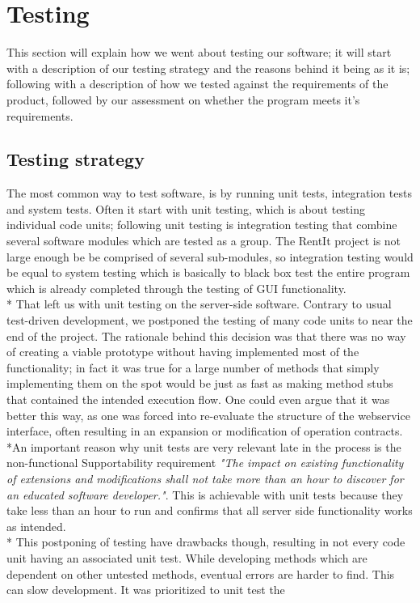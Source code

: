 \documentclass[a4paper,11pt,report]{article}
\begin{document}
{\section{Testing}
This section will explain how we went about testing our software; it will start with a description of our testing strategy and the reasons behind it being
as it is; following with a description of how we tested against the requirements of the product, followed by our assessment on whether the program meets it's requirements.

\subsection{Testing strategy}
The most common way to test software, is by running unit tests, integration tests and system tests. Often it start with unit testing, which is about testing individual code units; following unit testing is integration testing that combine several software modules which are tested as a group. The RentIt project is not large enough be be comprised of
several sub-modules, so integration testing would be equal to system testing which is basically to black box test the entire program which is already completed
through the testing of GUI functionality.
\\*
That left us with unit testing on the server-side software. Contrary to usual test-driven development, we postponed the testing of many code units to near
the end of the project. The rationale behind this decision was that there was no way of creating a viable prototype without having implemented most of the 
functionality; in fact it was true for a large number of methods that simply implementing them on the spot would be just as fast as making method stubs 
that contained the intended execution flow. One could even argue that it was better this way, as one was forced into re-evaluate the structure of the webservice
interface, often resulting in an expansion or modification of operation contracts. \\*An important reason why unit tests are very relevant late in the process is the non-functional Supportability requirement 
\textit{"The impact on existing functionality of extensions and modifications shall not take more than an hour to discover for an educated software developer."}.
This is achievable with unit tests because they take less than an hour to run and confirms that all server side functionality works as intended.
\\*
This postponing of testing have drawbacks though, resulting in not every code unit having an associated unit test. While developing methods which are dependent on other untested methods, eventual errors are harder to find. This can slow development. It was prioritized to unit test the
}
\end{document}
